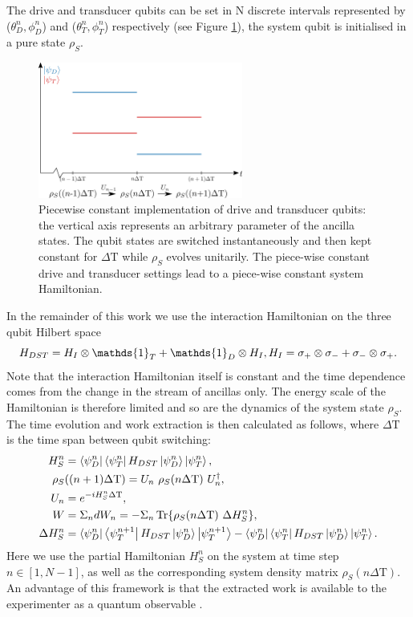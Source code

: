 The drive and transducer qubits can be set in N discrete intervals represented by ($\theta_D^n, \phi_D^n$) and ($\theta_T^n, \phi_T^n$) respectively (see Figure \ref{pwc}), the system qubit is initialised in a pure state $\rho_S$.

\begin{figure}[h]
	\centering
	\includegraphics[width=0.6\textwidth]{img/pwc2}
	\caption{Piecewise constant implementation of drive and transducer qubits: the vertical axis represents an arbitrary parameter of the ancilla states. The qubit states are switched instantaneously and then kept constant for $\Delta \mathrm{T}$ while $\rho_S$ evolves unitarily. The piece-wise constant drive and transducer settings lead to a piece-wise constant system Hamiltonian.}
	\label{pwc}
\end{figure}

In the remainder of this work we use the interaction Hamiltonian on the three qubit Hilbert space
\begin{equation*}
H_{DST} = H_{I} \otimes \mathds{1}_T + \mathds{1}_D \otimes H_{I}, \\
H_{I} = \sigma_{+} \otimes \sigma_{-} + \sigma_{-} \otimes \sigma_{+}.
\end{equation*}
Note that the interaction Hamiltonian itself is constant and the time dependence comes from the change in the stream of ancillas only.
The energy scale of the Hamiltonian is therefore limited and so are the dynamics of the system state $\rho_S$.
The time evolution and work extraction is then calculated as follows, where $\Delta \mathrm{T}$ is the time span between qubit switching:
\begin{align}
H_S^n &= \bra{\psi_D^n}\bra{\psi_T^n} H_{DST} \ket{\psi_D^n} \ket{\psi_T^n}, \label{relham}\\
\rho_S &((n+1) \Delta \mathrm{T}) = U_n \ \rho_S(n \Delta \mathrm{T}) \ U^{\dagger}_n, \nonumber \\
U_n &= e^{-iH_S^n \Delta \mathrm{T}}, \nonumber \\ 
W &= \Sigma_n dW_n = - \Sigma_n \Tr{\rho_S(n \Delta \mathrm{T}) \ \Delta H_S^n}, \label{dw} \\
\Delta H_S^n &= \bra{\psi_D^n}\bra{\psi_T^{n+1}} H_{DST} \ket{\psi_D^n} \ket{\psi_T^{n+1}} - \bra{\psi_D^n}\bra{\psi_T^n} H_{DST} \ket{\psi_D^n} \ket{\psi_T^n}. \label{deltaham}
\end{align}
Here we use the partial Hamiltonian $H_S^n$ on the system at time step $n \in [1, N - 1]$, as well as the corresponding system density matrix $\rho_S(n \Delta \mathrm{T})$.
An advantage of this framework is that the extracted work is available to the experimenter as a quantum observable \cite{beyer2020}.

